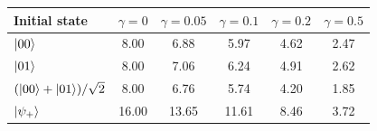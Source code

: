 \begin{tabular}{@{}lccccc@{}}
\toprule
Initial state & $\gamma=0$ & $\gamma=0.05$ & $\gamma=0.1$ & $\gamma=0.2$ & $\gamma=0.5$\\
\midrule
$\left|00\right\rangle$ & 8.00 & 6.88 & 5.97 & 4.62 & 2.47\\
$\left|01\right\rangle$ & 8.00 & 7.06 & 6.24 & 4.91 & 2.62\\
$(\left|00\right\rangle+\left|01\right\rangle)/\sqrt2$ & 8.00 & 6.76 & 5.74 & 4.20 & 1.85\\
$\left|\psi_+\right\rangle$ & 16.00 & 13.65 & 11.61 & 8.46 & 3.72\\
\bottomrule
\end{tabular}
